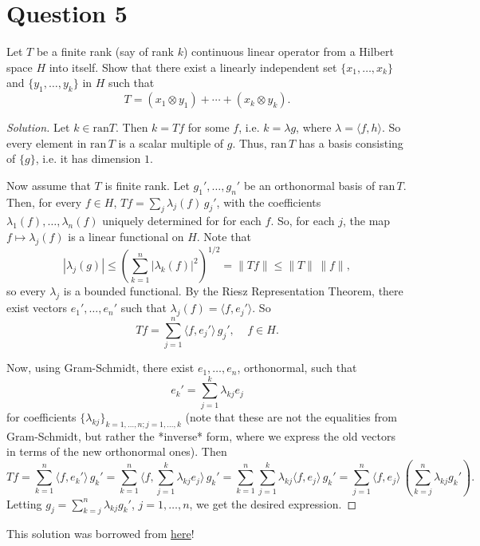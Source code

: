 \section{Question 5}
\horz
Let $T$ be a finite  rank  (say of rank $k$)  continuous linear operator from a Hilbert space $H$ into itself. Show that there exist a linearly independent set $\{x_1,\ldots,x_k\}$ and $\{y_1,\ldots,y_k\}$ in $H$ such that $$T= (x_1\otimes y_1) + \cdots + (x_k\otimes y_k).$$  
\horz
\begin{proof}[Solution]
    Let $k\in\text{ran} T$. Then $k=Tf$ for some $f$, i.e. $k=\lambda g$, where $\lambda=\langle f,h\rangle$. So every element in $\text{ran}\,T$ is a scalar multiple of $g$. Thus, $\text{ran}\,T$ has a basis consisting of $\{g\}$, i.e. it has dimension $1$. 

Now assume that $T$ is finite rank. Let $g_1',\ldots,g_n'$ be an orthonormal basis of $\text{ran}\,T$. Then, for every $f\in H$, $Tf=\sum_j\lambda_j(f)\,g_j'$, with the coefficients $\lambda_1(f),\ldots,\lambda_n(f)$ uniquely determined for for each $f$. So, for each $j$, the map $f\mapsto\lambda_j(f)$ is a linear functional on $H$. Note that
$$
|\lambda_j(g)|\leq\left(\sum_{k=1}^n|\lambda_k(f)|^2\right)^{1/2}=\|Tf\|\leq\|T\|\,\|f\|,
$$
so every $\lambda_j$ is a bounded functional. By the Riesz Representation Theorem, there exist vectors $e_1',\ldots,e_n'$ such that $\lambda_j(f)=\langle f,e_j'\rangle$. So
$$
Tf=\sum_{j=1}^n\langle f,e_j'\rangle\,g_j',\ \ \ \ \ f\in H.
$$

Now, using Gram-Schmidt, there exist $e_1,\ldots,e_n$, orthonormal, such that 
$$
e_k'=\sum_{j=1}^k\lambda_{kj}e_j
$$
for coefficients $\{\lambda_{kj}\}_{k=1,\ldots,n; j=1,\ldots,k}$ (note that these are not the equalities from Gram-Schmidt, but rather the *inverse* form, where we express the old vectors in terms of the new orthonormal ones). Then 
$$
Tf=\sum_{k=1}^n\langle f,e_k'\rangle\,g_k'=\sum_{k=1}^n\langle f,\sum_{j=1}^k\lambda_{kj}e_j\rangle\,g_k'=\sum_{k=1}^n\sum_{j=1}^k\lambda_{kj}\langle f,e_j\rangle\,g_k'=\sum_{j=1}^n\langle f,e_j\rangle\,\left(\sum_{k=j}^n\lambda_{kj}g_k'\right).
$$
Letting $g_j=\sum_{k=j}^n\lambda_{kj}g_k'$, $j=1,\ldots,n$, we get the desired expression.
\end{proof}
This solution was borrowed from \href{https://math.stackexchange.com/q/3149459/151611}{here}!
